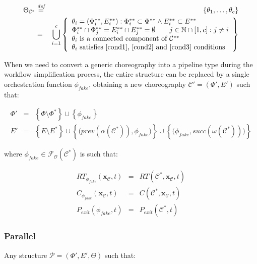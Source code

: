 \documentclass[12pt,a4paper]{report}
\newcommand{\mathDef}{\overset{\textit{def}}{=}}
\newcommand{\N}{\mathbb{N}}
\newcommand{\SetFromOneTo}[1]{\N \cap \left[1,#1\right]}
\begin{document}
\begin{eqnarray}
	\Theta_{\mathcal{C}^*} & \mathDef & \left\lbrace \theta_1, \ldots ,\theta_c \right\rbrace \\ & = & \bigcup_{i = 1}^c \left\{ \begin{array}{l}
		\theta_i = (\Phi^{**}_i, E^{**}_i) : \Phi^{**}_i \subset \Phi^{**} \wedge E^{**}_i \subset E^{**} \\ 
		\Phi^{**}_i \cap \Phi^{**}_j = E^{**}_i \cap E^{**}_j = \emptyset \qquad j \in \SetFromOneTo{c}: j \neq i \\
		\text{$\theta_i$ is a connected component of $\mathcal{C}^{**}$} \\	
		\text{$\theta_i$ satisfies \ref{cond1}, \ref{cond2} and \ref{cond3} conditions}
	\end{array} \right\} \nonumber
\end{eqnarray}

When we need to convert a generic choreography into a pipeline type during the workflow simplification process, the entire structure can be replaced by a single orchestration function $\phi_{fake}$, obtaining a new choreography $\mathcal{C}' = (\Phi',E')$ such that:

\begin{eqnarray}
	\Phi' & = & \left\{ \Phi \setminus \Phi^* \right\} \cup \left\{ \phi_{fake} \right\} \\
	E' & = & \left\{ E \setminus E^* \right\} \cup \left\{\bigg(prev(\alpha(\mathcal{C}^*)), \phi_{fake}\bigg) \right\} \cup \left\{\bigg(\phi_{fake}, succ(\omega(\mathcal{C}^*)) \bigg) \right\}
\end{eqnarray}

where $\phi_{fake} \in \mathscr{F_O}(\mathcal{C}^*)$ is such that:

\begin{eqnarray}
	RT_{\phi_{fake}}(\textbf{x}_{\mathcal{C}}, t) & = & RT(\mathcal{C}^*,\textbf{x}_{\mathcal{C}}, t) \\
	C_{\phi_{fake}}(\textbf{x}_{\mathcal{C}}, t) & = & C(\mathcal{C}^*,\textbf{x}_{\mathcal{C}}, t) \\
	P_{exit}(\phi_{fake}, t) & = & P_{exit}(\mathcal{C}^*, t)
\end{eqnarray}


\subsubsection{Parallel}

Any structure $\mathcal{P} = (\Phi',E',\Theta)$ such that:
\end{document}
